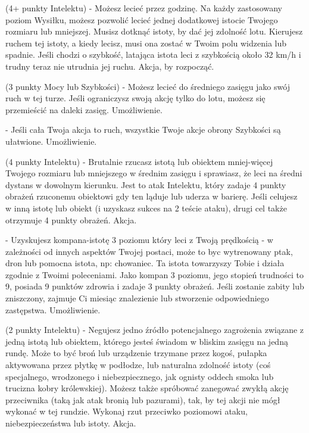 { (4+ punkty Intelektu) - Możesz lecieć przez godzinę. Na każdy zastosowany poziom Wysiłku, możesz pozwolić lecieć jednej dodatkowej istocie Twojego rozmiaru lub mniejszej.  Musisz dotknąć istoty, by dać jej zdolność lotu. Kierujesz ruchem tej istoty, a kiedy lecisz, musi ona zostać w Twoim polu widzenia lub spadnie. Jeśli chodzi o szybkość, latająca istota leci z szybkością około 32 km/h i trudny teraz nie utrudnia jej ruchu. Akcja, by rozpocząć. 

 (3 punkty Mocy lub Szybkości) - Możesz lecieć do średniego zasięgu jako swój ruch w tej turze. Jeśli ograniczysz swoją akcję tylko do lotu, możesz się przemieścić na daleki zasięg. Umożliwienie.

 - Jeśli cała Twoja akcja to ruch, wszystkie Twoje akcje obrony Szybkości są ułatwione. Umożliwienie.

 (4 punkty Intelektu) - Brutalnie rzucasz istotą lub obiektem mniej-więcej Twojego rozmiaru lub mniejszego w średnim zasięgu i sprawiasz, że leci na średni dystans w dowolnym kierunku. Jest to atak Intelektu, który zadaje 4 punkty obrażeń rzuconemu obiektowi gdy ten ląduje lub uderza w barierę. Jeśli celujesz w inną istotę lub obiekt (i uzyskasz sukces na 2 teście ataku), drugi cel także otrzymuje 4 punkty obrażeń. Akcja.

 - Uzyskujesz kompana-istotę 3 poziomu który leci z Twoją prędkością - w zależności od innych aspektów Twojej postaci, może to byc wytrenowany ptak, dron lub pomocna istota, np: chowaniec. Ta istota towarzyszy Tobie i działa zgodnie z Twoimi poleceniami. Jako kompan 3 poziomu, jego stopień trudności to 9, posiada 9 punktów zdrowia i zadaje 3 punkty obrażeń. Jeśli zostanie zabity lub zniszczony, zajmuje Ci miesiąc znalezienie lub stworzenie odpowiedniego zastępstwa. Umożliwienie.

 (2 punkty Intelektu) - Negujesz jedno źródło potencjalnego zagrożenia związane z jedną istotą lub obiektem, którego jesteś świadom w bliskim zasięgu na jedną rundę. Może to być broń lub urządzenie trzymane przez kogoś, pułapka aktywowana przez płytkę w podłodze, lub naturalna zdolność istoty (coś specjalnego, wrodzonego i niebezpiecznego, jak ognisty oddech smoka lub trucizna kobry królewskiej). Możesz także spróbować zanegować zwykłą akcję przeciwnika (taką jak atak bronią lub pazurami), tak, by tej akcji nie mógł wykonać w tej rundzie. Wykonaj rzut przeciwko poziomowi ataku, niebezpieczeństwa lub istoty. Akcja.

}
